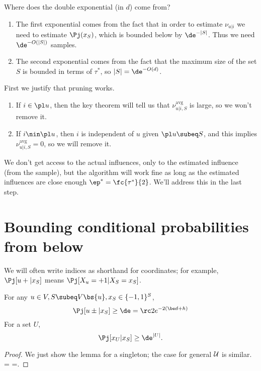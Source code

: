Where does the double exponential (in $d$) come from? 
\begin{enumerate}
\item The first exponential comes from the fact that in order to estimate $\nu_{u|i}$ we need to estimate $\Pj(x_S)$, which is bounded below by $\de^{-|S|}$. Thus we need $\de^{-O(|S|)}$ samples.
\item
The second exponential comes from the fact that the maximum size of the set $S$ is bounded in terms of $\tau^*$, so $|S|=\de^{-O(d)}$.
\end{enumerate}


%
%
First we justify that pruning works. 
\begin{enumerate}
\item
If $i\in \pl u$, then the key theorem will tell us that $\nu_{u|i,S}^{\text{avg}}$ is large, so we won't remove it.
\item
If $i\nin \pl u$, then $i$ is independent of $u$ given $\pl u\subeq S$, and this implies $\nu_{u|i,S}^{\text{avg}}=0$, so we will remove it.
\end{enumerate}
We don't get access to the actual influences, only to the estimated influence (from the sample), but the algorithm will work fine as long as the estimated influences are close enough $\ep^*=\fc{\tau^*}{2}$. We'll address this in the last step.

\section{Bounding conditional probabilities from below}

We will often write indices as shorthand for coordinates; for example, $\Pj[u+|x_S]$ means $\Pj[X_u=+1|X_S=x_S]$.

\begin{lem}
For any $u\in V, S\subeq V\bs \{u\}, x_S\in \{-1,1\}^S$, 
\[
\Pj[u\pm |x_S]\ge \de=\rc2e^{-2(\be d+h)}
\]
For a set $U$,
\[
\Pj[x_{U}|x_S]\ge \de^{|U|}.
\]
\end{lem}

\begin{proof}
We just show the lemma for a singleton; the case for general $\cal U$ is similar.
\Pj[u+ | x_{V\bs u}] =  =\ge \de.
\eeq
\end{proof}

